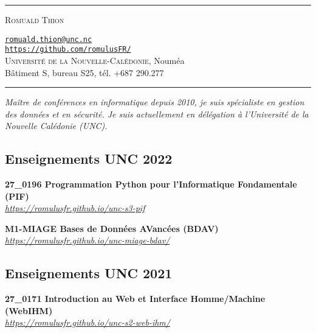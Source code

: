 \documentclass[12pt,a4paper]{article}
\newcommand{\hr}{\textcolor{gris80}{\rule{\linewidth}{0.5pt}}}
\newcommand{\activite}[1]{\textbf{#1}\xspace}
\newcommand{\comment}[1]{\textsl{#1}\xspace}
\newcommand{\UNC}{\textsc{Universit{\'e} de la Nouvelle-Calédonie}\xspace}
\begin{document}
\hr

\vspace{0.5em}

\begin{minipage}[c]{0.5\textwidth}
  \begin{center}
    {\LARGE\textsc{Romuald Thion}} %
  \end{center}
\end{minipage}
\begin{minipage}[c]{0.5\textwidth}
  \begin{center}
    \href{mailto:romuald.thion@unc.nc}{\nolinkurl{romuald.thion@unc.nc}}\\
    \href{https://github.com/romulusFR/}{\nolinkurl{https://github.com/romulusFR/}}\\
    \UNC, Nouméa\\
    Bâtiment S, bureau S25, tél. +687 290.277
  \end{center}
\end{minipage}

\vspace{0.5em}

\hr

\begin{center}
  \emph{Maître de conférences en informatique depuis 2010, je suis spécialiste en gestion des données et en sécurité. Je suis actuellement en délégation à l'Université de la Nouvelle Calédonie (UNC).}
\end{center}

\subsection*{Enseignements UNC 2022} 
     \activite{27\_0196 Programmation Python pour l'Informatique Fondamentale (PIF)}\\
     \comment{\url{https://romulusfr.github.io/unc-s3-pif}} 

     \activite{M1-MIAGE Bases de Données AVancées (BDAV)}\\
     \comment{\url{https://romulusfr.github.io/unc-miage-bdav/}} 


\subsection*{Enseignements UNC 2021} 
     \activite{27\_0171 Introduction au Web et Interface Homme/Machine (WebIHM)}\\
     \comment{\url{https://romulusfr.github.io/unc-s2-web-ihm/}} 
\end{document}
